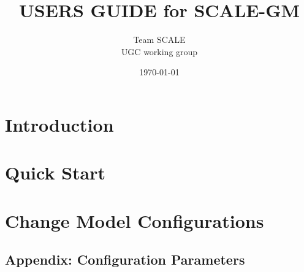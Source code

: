 \documentclass[a4paper]{report}
\title{{\Huge USERS GUIDE for SCALE-GM\\
        \vspace{2cm}{\Large Version \version} }}
\author{\Large Team SCALE\\ UGC working group}
\date{\today}
\begin{document}
\maketitle



\clearpage
\tableofcontents

\chapter{Introduction}


\chapter{Quick Start}


\chapter{Change Model Configurations}


%

\clearpage


\begin{appendix}
\chapter{Appendix: Configuration Parameters}

\end{appendix}

\end{document}
